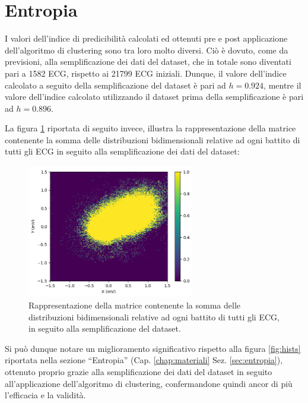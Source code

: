 \documentclass[12pt,italian]{report}
\begin{document}
	
	\section{Entropia}
	\label{sec:entropia_risultati}
	
	I valori dell'indice di predicibilità calcolati ed ottenuti pre e post applicazione dell'algoritmo di clustering sono tra loro molto diversi. Ciò è dovuto, come da previsioni, alla semplificazione dei dati del dataset, che in totale sono diventati pari a 1582 ECG, rispetto ai 21799 ECG iniziali. Dunque, il valore dell'indice calcolato a seguito della semplificazione del dataset è pari ad $ h = 0.924 $, mentre il valore dell'indice calcolato utilizzando il dataset prima della semplificazione è pari ad $ h = 0.896 $.
	
	La figura \ref{fig:hists2} riportata di seguito invece, illustra la rappresentazione della matrice contenente la somma delle distribuzioni bidimensionali relative ad ogni battito di tutti gli ECG in seguito alla semplificazione dei dati del dataset:
	
	\begin{figure}[H]
		\centering
		\includegraphics[width=0.65\textwidth]{immagini/hists2.png}
		\captionsetup{justification=centering}
		\caption{Rappresentazione della matrice contenente la somma delle distribuzioni bidimensionali relative ad ogni battito di tutti gli ECG, in seguito alla semplificazione del dataset.}
		\label{fig:hists2}
	\end{figure}
	
	Si può dunque notare un miglioramento significativo rispetto alla figura \ref{fig:hists} riportata nella sezione ``Entropia'' (Cap. \ref{chap:materiali} Sez. \ref{sec:entropia}), ottenuto proprio grazie alla semplificazione dei dati del dataset in seguito all'applicazione dell'algoritmo di clustering, confermandone quindi ancor di più l'efficacia e la validità.
	
\end{document}
